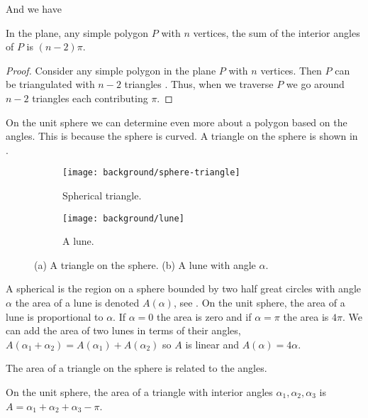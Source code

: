 And we have
\begin{corollary}\label{cor:angles}
In the plane, any simple polygon $P$ with $n$ vertices,
the sum of the interior angles of $P$ is $(n-2)\pi$.
\end{corollary}

\begin{proof}
	Consider any simple polygon in the plane $P$ with $n$ vertices. 
	Then $P$ can be triangulated with $n-2$ triangles \cite{orourke_computational_1994}.
	Thus, when we traverse $P$ we go around $n-2$ triangles each contributing
	$\pi$.
\end{proof}

 





On the unit sphere we can determine even more about a polygon 
based on the angles. This is because the sphere is curved.
A triangle on the sphere is shown in .


 \begin{figure}[htb]
         \centering
        \begin{subfigure}[b]{0.35\textwidth}
         \texttt{[image: background/sphere-triangle]}
         \caption{Spherical triangle.}
 	 \label{fig:sphere-triangle}
       \end{subfigure}
         \hspace{1cm}
         \begin{subfigure}[b]{0.35\textwidth}
         \texttt{[image: background/lune]}
         \caption{A lune.}
          \label{fig:lune}
         \end{subfigure}
		\caption{(a) A triangle on the sphere.
 		(b) A lune with angle $\alpha$.
 		\label{fig:sphere-lune}}
 \end{figure}
A spherical  is the region on a sphere bounded by two half great circles
with angle $\alpha$ the area of a lune is denoted $A(\alpha)$,
 see .
On the unit sphere, the area of a lune is proportional to $\alpha$. 
If $\alpha=0$ the area is zero and if $\alpha=\pi$ the area is $4\pi$.
We can add the area of two lunes in terms of their angles, 
$A(\alpha_1+\alpha_2)=A(\alpha_1)+A(\alpha_2)$ so $A$ is linear
and  $A(\alpha)=4\alpha.$




The area of a triangle on the sphere is related to the angles.

\begin{lemma}\label{lem:spherical-triangle}
On the unit sphere, the area of a triangle with interior angles $\alpha_1, \alpha_2, \alpha_3$
is $A=\alpha_1+\alpha_2+\alpha_3-\pi$.
\end{lemma}

